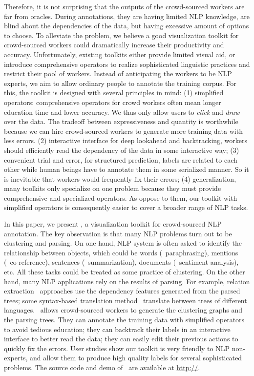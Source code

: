 Therefore, it is not surprising that the outputs of the crowd-sourced workers are far from oracles. During annotations, they are having limited NLP knowledge, are blind about the dependencies of the data, but having excessive amount of options to choose. To alleviate the problem, we believe a good visualization toolkit for crowd-sourced workers could dramatically increase their productivity and accuracy. Unfortunately, existing toolkits either provide limited visual aid, or introduce comprehensive operators to realize sophisticated linguistic practices and restrict their pool of workers. Instead of anticipating the workers to be NLP experts, we aim to allow ordinary people to annotate the training corpus. For this, the toolkit is designed with several principles in mind: (1) simplified operators: comprehensive operators for crowd workers often mean longer education time and lower accuracy. We thus only allow users to {\em click} and {\em draw} over the data. The tradeoff between expressiveness and quantity is worthwhile because we can hire crowd-sourced workers to generate more training data with less errors. (2) interactive interface for deep lookahead and backtracking, workers should efficiently read the dependency of the data in some interactive way; (3) convenient trial and error, for structured prediction, labels are related to each other while human beings have to annotate them in some serialized manner. So it is inevitable that workers would frequently fix their errors; (4) generalization, many toolkits only specialize on one problem because they must provide comprehensive and specialized operators. As oppose to them, our toolkit with simplified operators is consequently easier to cover a broader range of NLP tasks.

In this paper, we present \sys, a visualization toolkit for crowd-sourced NLP annotation. The key observation is that many NLP problems turn out to be clustering and parsing. On one hand, NLP system is often asked to identify the relationship between objects, which could be words (\eg\ paraphrasing), mentions (\eg\ co-reference), sentences (\eg\ summarization), documents (\eg\ sentiment analysis), etc. All these tasks could be treated as some practice of clustering. On the other hand, many NLP applications rely on the results of parsing. For example, relation extraction~\cite{hoffmann2011knowledge} approaches use the dependency features generated from the parsed trees; some syntax-based translation method~\cite{chiang2010learning} translate between trees of different languages. \sys\ allows crowd-sourced workers to generate the clustering graphs and the parsing trees. They can annotate the training data with simplified operators to avoid tedious education; they can backtrack their labels in an interactive interface to better read the data; they can easily edit their previous actions to quickly fix the errors. User studies show our toolkit is very friendly to NLP non-experts, and allow them to produce high quality labels for several sophisticated problems.  The source code and demo of \sys\ are available at \url{http://}.

